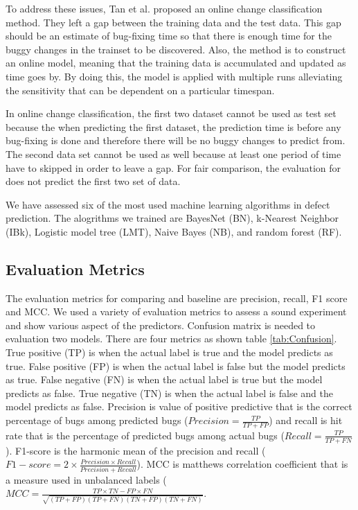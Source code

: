 To address these issues, Tan et al. \cite{tan2015online} proposed an online change classification method.
They left a gap between the training data and the test data.
This gap should be an estimate of bug-fixing time so that there is enough time for the buggy changes in the trainset to be discovered.
Also, the method is to construct an online model, meaning that the training data is accumulated and updated as time goes by.
By doing this, the model is applied with multiple runs alleviating the sensitivity that can be dependent on a particular timespan.

In online change classification, the first two dataset cannot be used as test set because the when predicting the first dataset, the prediction time is before any bug-fixing is done and therefore there will be no buggy changes to predict from. The second data set cannot be used as well because at least one period of time have to skipped in order to leave a gap.
For fair comparison, the evaluation for {\simfinmo} does not predict the first two set of data.

We have assessed six of the most used machine learning algorithms in defect prediction.
The alogrithms we trained are BayesNet (BN), k-Nearest Neighbor (IBk), Logistic model tree (LMT), Naive Bayes (NB), and random forest (RF).

\subsection{Evaluation Metrics}
The evaluation metrics for comparing {\simfinmo} and baseline are precision, recall, F1 score and MCC.
We used a variety of evaluation metrics to assess a sound experiment and show various aspect of the predictors.
Confusion matrix is needed to evaluation two models.
There are four metrics as shown table \ref{tab:Confusion}.
True positive (TP) is when the actual label is true and the model predicts as true.
False positive (FP) is when the actual label is false but the model predicts as true.
False negative (FN) is when the actual label is true but the model predicts as false.
True negative (TN) is when the actual label is false and the model predicts as false.
Precision is value of positive predictive that is the correct percentage of bugs among predicted bugs ($Precision = \frac{TP}{TP + FP}$) and recall is hit rate that is the percentage of predicted bugs among actual bugs ($Recall = \frac{TP}{TP + FN}$).
F1-score is the harmonic mean of the precision and recall ($F1-score = 2 \times \frac{Precision \times Recall}{Precision + Recall}$). 
MCC is matthews correlation coefficient that is a measure used in unbalanced labels ($MCC = \frac{TP \times TN - FP \times FN}{\sqrt{(TP + FP)(TP + FN)(TN + FP)(TN + FN)}}$. 

